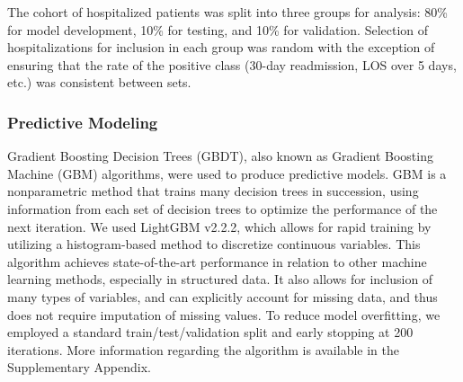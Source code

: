 The cohort of hospitalized patients was split into three groups for analysis: 
80\% for model development, 10\% for testing, and 10\% for validation. 
Selection of hospitalizations for inclusion in each group was random 
with the exception of ensuring that the rate of the positive class 
(30-day readmission, LOS over 5 days, etc.) was consistent between sets.
% 
% 
% 
% 
\subsubsection{Predictive Modeling}

Gradient Boosting Decision Trees (GBDT), 
also known as Gradient Boosting Machine (GBM) algorithms, 
were used to produce predictive models. 
GBM is a nonparametric method that trains many decision trees in succession, 
using information from each set of decision trees 
to optimize the performance of the next iteration.\supercite{gbmtutorial}
We used LightGBM v2.2.2, which allows for rapid training by utilizing a 
histogram-based method to discretize continuous variables.
This algorithm achieves state-of-the-art performance in relation to 
other machine learning methods, especially in structured data.\supercite{lightgbm} 
It also allows for inclusion of many types of variables, 
and can explicitly account for missing data, 
and thus does not require imputation of missing values. 
To reduce model overfitting, we employed a standard train/test/validation split 
and early stopping at 200 iterations.\supercite{esl, zhang2005boosting}
More information regarding the algorithm is available in the Supplementary Appendix.


